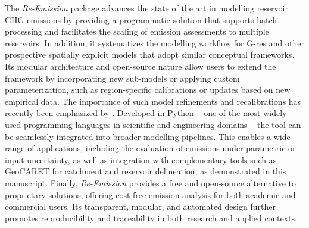 \documentclass[final,1p,times]{elsarticle}
\begin{document}
The \emph{Re-Emission} package advances the state of the art in modelling reservoir \ac{GHG} emissions by providing a programmatic solution that supports batch processing and facilitates the scaling of emission assessments to multiple reservoirs.
In addition, it systematizes the modelling workflow for G-res and other prospective spatially explicit models that adopt similar conceptual frameworks. 
Its modular architecture and open-source nature allow users to extend the framework by incorporating new sub-models or applying custom parameterization, such as region-specific calibrations or updates based on new empirical data.
The importance of such model refinements and recalibrations has recently been emphasized by \citet{Pilla2025}.
Developed in Python -- one of the most widely used programming languages in scientific and engineering domains -- the tool can be seamlessly integrated into broader modelling pipelines.
This enables a wide range of applications, including the evaluation of emissions under parametric or input uncertainty, as well as integration with complementary tools such as GeoCARET for catchment and reservoir delineation, as demonstrated in this manuscript.
Finally, \emph{Re-Emission} provides a free and open-source alternative to proprietary solutions, offering cost-free emission analysis for both academic and commercial users.
Its transparent, modular, and automated design further promotes reproducibility and traceability in both research and applied contexts.

\end{document}
